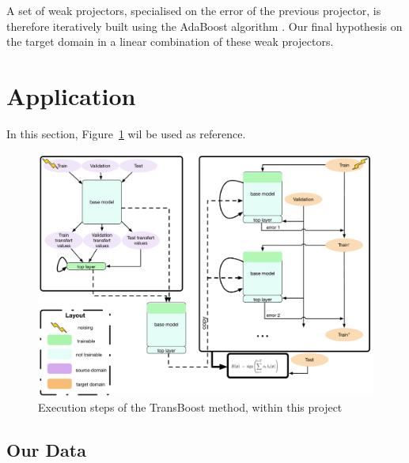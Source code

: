 \documentclass[11 pt]{article}
\begin{document}
A set of weak projectors, specialised on the error of the previous projector, is therefore iteratively built using the AdaBoost algorithm \cite{boosting}. Our final hypothesis on the target domain in a linear combination of these weak projectors.

\section{Application}

In this section, Figure~\ref{figRes} wil be used as reference.

\begin{figure}[H]
  \includegraphics[width=\textwidth]{fig1.pdf}
    \caption{Execution steps of the TransBoost method, within this project}
  \label{figRes}
\end{figure}

\subsection{Our Data}
\end{document}
